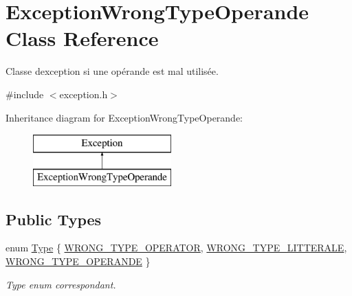 \hypertarget{class_exception_wrong_type_operande}{}\section{Exception\+Wrong\+Type\+Operande Class Reference}
\label{class_exception_wrong_type_operande}


Classe d\textquotesingle{}exception si une opérande est mal utilisée.  




{\ttfamily \#include $<$exception.\+h$>$}

Inheritance diagram for Exception\+Wrong\+Type\+Operande\+:\begin{figure}[H]
\begin{center}
\leavevmode
\includegraphics[height=2.000000cm]{class_exception_wrong_type_operande}
\end{center}
\end{figure}
\subsection*{Public Types}
\begin{DoxyCompactItemize}
\item 
enum \hyperlink{class_exception_wrong_type_operande_a1a1fb938febe831c80823eca12a76bd4}{Type} \{ \hyperlink{class_exception_wrong_type_operande_a1a1fb938febe831c80823eca12a76bd4ab4f913c31339309e9b0931d7ebb8a219}{W\+R\+O\+N\+G\+\_\+\+T\+Y\+P\+E\+\_\+\+O\+P\+E\+R\+A\+T\+OR}, 
\hyperlink{class_exception_wrong_type_operande_a1a1fb938febe831c80823eca12a76bd4ab13d299763581773ae9da27813cb89b9}{W\+R\+O\+N\+G\+\_\+\+T\+Y\+P\+E\+\_\+\+L\+I\+T\+T\+E\+R\+A\+LE}, 
\hyperlink{class_exception_wrong_type_operande_a1a1fb938febe831c80823eca12a76bd4acabbde7810b1e485ac025b4663e730ae}{W\+R\+O\+N\+G\+\_\+\+T\+Y\+P\+E\+\_\+\+O\+P\+E\+R\+A\+N\+DE}
 \}\begin{DoxyCompactList}\small\item\em Type enum correspondant. \end{DoxyCompactList}
\end{DoxyCompactItemize}
